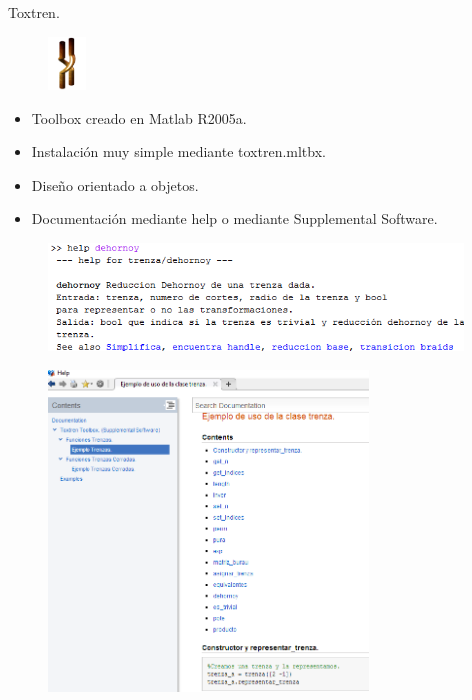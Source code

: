 \documentclass{beamer}
\begin{document}
\begin{frame}{Toxtren.}
	\begin{figure}[h!]
		\includegraphics[width=1cm]{imagenes/im.png}
	\end{figure}
     \begin{itemize}
     	\item Toolbox creado en Matlab R2005a.
     	\item Instalación muy simple mediante toxtren.mltbx.
     	\item Diseño orientado a objetos. 
     	\item Documentación mediante help o mediante Supplemental Software. 
     \end{itemize}
     \pause
     \begin{figure}[h!]
     	\includegraphics[width=11cm]{imagenes/help.png}
     \end{figure}
\end{frame}

\begin{frame}
	\begin{figure}[h!]
		\includegraphics[width=8.5cm]{imagenes/docu.png}
	\end{figure}
\end{frame}

\begin{frame}
\begin{center}
\end{center}
\end{frame}
\end{document}
